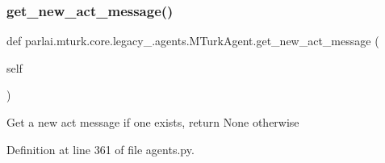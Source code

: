 \subsubsection{\texorpdfstring{get\+\_\+new\+\_\+act\+\_\+message()}{get\_new\_act\_message()}}
{\footnotesize\ttfamily def parlai.\+mturk.\+core.\+legacy\+\_.\+agents.\+M\+Turk\+Agent.\+get\+\_\+new\+\_\+act\+\_\+message (\begin{DoxyParamCaption}\item[{}]{self }\end{DoxyParamCaption})}

\begin{DoxyVerb}Get a new act message if one exists, return None otherwise\end{DoxyVerb}
 

Definition at line 361 of file agents.\+py.



